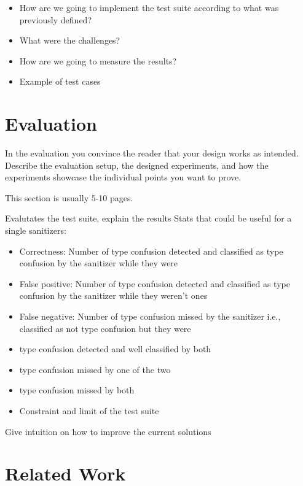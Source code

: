 \documentclass[a4paper,11pt,oneside]{report}
\begin{document}
\begin{itemize}
       \item How are we going to implement the test suite according to what was previously defined? 
       \item What were the challenges?
       \item How are we going to measure the results?
       \item Example of test cases
\end{itemize}


\chapter{Evaluation}

In the evaluation you convince the reader that your design works as intended.
Describe the evaluation setup, the designed experiments, and how the
experiments showcase the individual points you want to prove.

This section is usually 5-10 pages.

Evalutates the test suite, explain the results
Stats that could be useful for a single sanitizers:
\begin{itemize}
       \item Correctness: Number of type confusion detected and classified as type confusion by the sanitizer while they were
       \item False positive: Number of type confusion detected and classified as type confusion by the sanitizer while they weren't ones
       \item False negative: Number of type confusion missed by the sanitizer i.e., classified as not type confusion but they were

       \item type confusion detected and well classified by both
       \item type confusion missed by one of the two
       \item type confusion missed by both

       \item Constraint and limit of the test suite

\end{itemize}

Give intuition on how to improve the current solutions

\chapter{Related Work}
\end{document}
